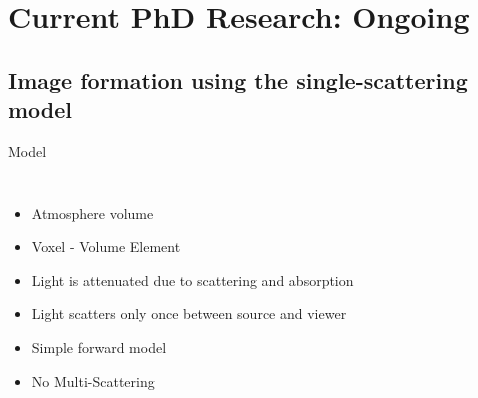 \documentclass[compress,red,12pt]{beamer}
\begin{document}

\section{Current PhD Research: Ongoing}


\subsection{Image formation using the single-scattering model}

\begin{frame}{Model}
  \begin{columns}[c]
    \begin{itemize}
    \item <1-2> Atmosphere volume
    \item <1-2> Voxel - Volume Element
    \item <3-4> Light is attenuated due to scattering and absorption
    \item <3-5> Light scatters only once between source and viewer
    \item <6> Simple forward model
    \item <6> No Multi-Scattering
    \end{itemize}


\end{columns}
\end{frame}
\end{document}
